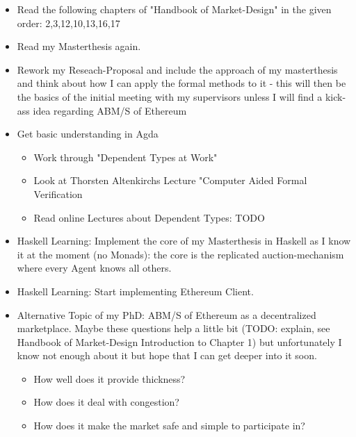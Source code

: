 \begin{itemize}
\item Read the following chapters of "Handbook of Market-Design" in the given order: 2,3,12,10,13,16,17
\item Read my Masterthesis again.
\item Rework my Reseach-Proposal and include the approach of my masterthesis and think about how I can apply the formal methods to it - this will then be the basics of the initial meeting with my supervisors unless I will find a kick-ass idea regarding ABM/S of Ethereum
\item Get basic understanding in Agda 
	\begin{itemize}
	\item Work through "Dependent Types at Work"
	\item Look at Thorsten Altenkirchs Lecture "Computer Aided Formal Verification
	\item Read online Lectures about Dependent Types: TODO
	\end{itemize}
\item Haskell Learning: Implement the core of my Masterthesis in Haskell as I know it at the moment (no Monads): the core is the replicated auction-mechanism where every Agent knows all others.
\item Haskell Learning: Start implementing Ethereum Client.
\item Alternative Topic of my PhD: ABM/S of Ethereum as a decentralized marketplace. Maybe these questions help a little bit (TODO: explain, see Handbook of Market-Design Introduction to Chapter 1) but unfortunately I know not enough about it but hope that I can get deeper into it soon.
	\begin{itemize}
	\item How well does it provide thickness? 
	\item How does it deal with congestion?
	\item How does it make the market safe and simple to participate in? 
	\end{itemize}
\end{itemize}


